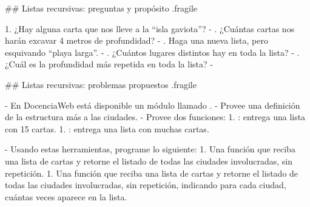 ## Listas recursivas: preguntas y propósito {.fragile}


1. ¿Hay alguna carta que nos lleve a la ``isla gaviota''?
    - 
. ¿Cuántas cartas nos harán excavar 4 metros de profundidad?
    - 
. Haga una nueva lista, pero esquivando ``playa larga''.
    - 
. ¿Cuántos lugares distintos hay en toda la lista?
    - 
. ¿Cuál es la profundidad más repetida en toda la lista?
    - 

## Listas recursivas: problemas propuestos {.fragile}

- En DocenciaWeb está disponible un módulo llamado .
    - Provee una definición de la estructura  más  a las ciudades.
    - Provee dos funciones:
        1. : entrega una lista con 15 cartas.
        1. : entrega una lista con muchas cartas.

- Usando estas herramientas, programe lo siguiente:
    1. Una función que reciba una lista de cartas y retorne el
    listado de todas las ciudades involucradas, sin repetición.
    1. Una función que reciba una lista de cartas y retorne el
    listado de todas las ciudades involucradas, sin repetición, indicando
    para cada ciudad, cuántas veces aparece en la lista.
